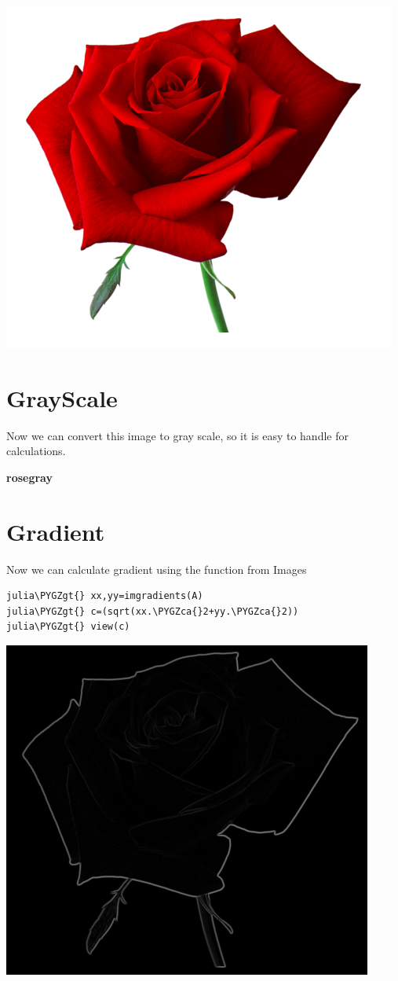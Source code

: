 \documentclass[letterpaper,10pt,english]{sphinxmanual}
\def\PYGZca{\char`\^}
\def\PYGZgt{\char`\>}
\begin{document}
\includegraphics{rose.png}


\section{GrayScale}
\label{Images:grayscale}
Now we can convert this image to gray scale, so it is easy to handle for calculations.

{\color{red}\bfseries{}\textbar{}rosegray\textbar{}}


\section{Gradient}
\label{Images:gradient}
Now we can calculate gradient using the function from Images

\begin{Verbatim}[commandchars=\\\{\}]
julia\PYGZgt{} xx,yy=imgradients(A)
julia\PYGZgt{} c=(sqrt(xx.\PYGZca{}2+yy.\PYGZca{}2))
julia\PYGZgt{} view(c)
\end{Verbatim}

\includegraphics{gradient.png}
\end{document}
